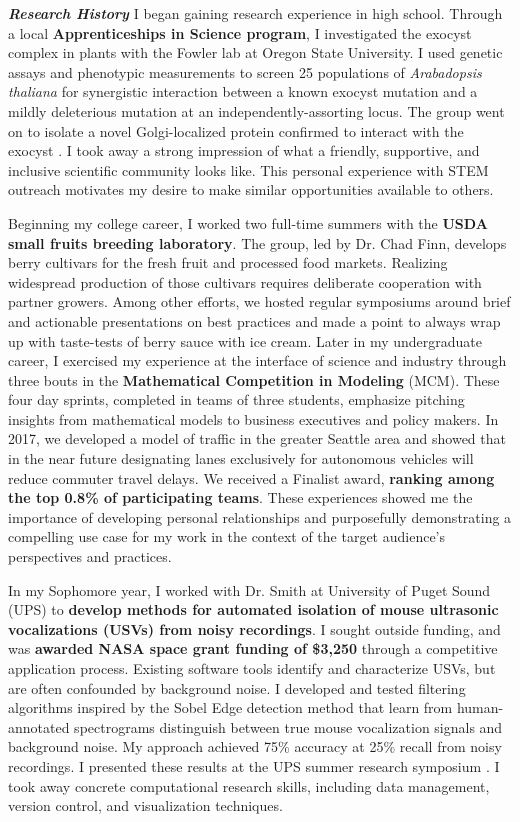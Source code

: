 \textit{\textbf{Research History}}
I began gaining research experience in high school.
Through a local \textbf{Apprenticeships in Science program}, I investigated the exocyst complex in plants with the Fowler lab at Oregon State University.
I used genetic assays and phenotypic measurements to screen 25 populations of \textit{Arabadopsis thaliana} for synergistic interaction between a known exocyst mutation and a mildly deleterious mutation at an independently-assorting locus.
The group went on to isolate a novel Golgi-localized protein confirmed to interact with the exocyst \cite{fowler}.
I took away a strong impression of what a friendly, supportive, and inclusive scientific community looks like.
This personal experience with STEM outreach motivates my desire to make similar opportunities available to others.

Beginning my college career, I worked two full-time summers with the \textbf{USDA small fruits breeding laboratory}.
The group, led by Dr. Chad Finn, develops berry cultivars for the fresh fruit and processed food markets.
Realizing widespread production of those cultivars requires deliberate cooperation with partner growers.
Among other efforts, we hosted regular symposiums around brief and actionable presentations on best practices and made a point to always wrap up with taste-tests of berry sauce with ice cream.
Later in my undergraduate career, I exercised my experience at the interface of science and industry through three bouts in the \textbf{Mathematical Competition in Modeling} (MCM).
These four day sprints, completed in teams of three students, emphasize pitching insights from mathematical models to business executives and policy makers.
In 2017, we developed a model of traffic in the greater Seattle area and showed that in the near future designating lanes exclusively for autonomous vehicles will reduce commuter travel delays.
We received a Finalist award, \textbf{ranking among the top 0.8\% of participating teams}.
These experiences showed me the importance of developing personal relationships and purposefully demonstrating a compelling use case for my work in the context of the target audience's perspectives and practices.%

In my Sophomore year, I worked with Dr. Smith at University of Puget Sound (UPS) to \textbf{develop methods for automated isolation of mouse
ultrasonic vocalizations (USVs) from noisy recordings}.
I sought outside funding, and was \textbf{awarded NASA space grant funding of \$3,250} through a competitive application process.
Existing software tools identify and characterize USVs, but are often confounded by background noise.
I developed and tested filtering algorithms inspired by the Sobel Edge detection method that learn from human-annotated spectrograms distinguish between true mouse vocalization signals and background noise.
My approach achieved 75\% accuracy at 25\% recall from noisy recordings.
I presented these results at the UPS summer research symposium \cite{smith}.
I took away concrete computational research skills, including data management, version control, and visualization techniques.


